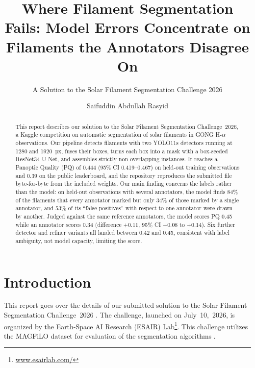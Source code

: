 \documentclass[sigconf]{acmart}
\begin{document}
\title[Where Filament Segmentation Fails]{Where Filament Segmentation Fails: Model Errors Concentrate on Filaments the Annotators Disagree On}
\subtitle{A Solution to the Solar Filament Segmentation Challenge 2026} %


\author{Saifuddin Abdullah Rasyid}

\begin{abstract}
    This report describes our solution to the Solar Filament Segmentation Challenge~2026, a Kaggle competition on automatic segmentation of solar filaments in GONG H-$\alpha$ observations. Our pipeline detects filaments with two YOLO11s detectors running at 1280 and 1920~px, fuses their boxes, turns each box into a mask with a box-seeded ResNet34 U-Net, and assembles strictly non-overlapping instances. It reaches a Panoptic Quality (PQ) of 0.444 (95\% CI 0.419--0.467) on held-out training observations and 0.39 on the public leaderboard, and the repository reproduces the submitted file byte-for-byte from the included weights. Our main finding concerns the labels rather than the model: on held-out observations with several annotators, the model finds 84\% of the filaments that every annotator marked but only 34\% of those marked by a single annotator, and 53\% of its ``false positives'' with respect to one annotator were drawn by another. Judged against the same reference annotators, the model scores PQ 0.45 while an annotator scores 0.34 (difference +0.11, 95\% CI +0.08 to +0.14). Six further detector and refiner variants all landed between 0.42 and 0.45, consistent with label ambiguity, not model capacity, limiting the score.
\end{abstract}

\maketitle

\ifguideStyle
{}
\par\medskip
\fi


\section{Introduction}
    This report goes over the details of our submitted solution to the Solar Filament Segmentation Challenge~2026 \cite{filament-segmentation-2026}. The challenge, launched on July~10,~2026, is organized by the Earth-Space AI Research (ESAIR) Lab\footnote{\href{https://www.esairlab.com/home}{www.esairlab.com/}}. This challenge utilizes the MAGFiLO dataset for evaluation of the segmentation algorithms \cite{ahmadzadeh2024dataset}.
\end{document}
